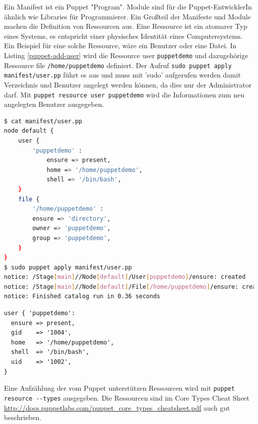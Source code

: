 \documentclass[12pt,a4paper,ngerman]{article}
\begin{document}
Ein Manifest ist ein Puppet "Program". Module sind für die Puppet-EntwicklerIn ähnlich wie Libraries für Programmierer. Ein Großteil der Manifeste und Module machen die Definition von Ressourcen aus. Eine Ressource ist ein atomarer Typ eines Systems, es entspricht einer physisches Identität eines Computersystems. Ein Beispiel für eine solche Ressource, wäre ein Benutzer oder eine Datei. In Listing \ref{puppet-add-user} wird die Ressource user \lstinline$puppetdemo$ und dazugehörige Ressource file \lstinline$/home/puppetdemo$ definiert. Der Aufruf \lstinline$sudo puppet apply manifest/user.pp$ führt es aus und muss mit 'sudo' aufgerufen werden damit Verzeichnis und Benutzer angelegt werden können, da dies nur der Administrator darf.
Mit \lstinline$puppet resource user puppetdemo$ wird die Informationen zum neu angelegten Benutzer ausgegeben.


\begin{lstlisting}[language=sh,caption=User mit Puppet anlegen, label=puppet-add-user]
$ cat manifest/user.pp 
node default {
    user {
        'puppetdemo' :
            ensure => present,
            home => '/home/puppetdemo',
            shell => '/bin/bash',
    }
    file {
        '/home/puppetdemo' :
        ensure => 'directory',
        owner => 'puppetdemo',
        group => 'puppetdemo',
    }
}
$ sudo puppet apply manifest/user.pp 
notice: /Stage[main]//Node[default]/User[puppetdemo]/ensure: created
notice: /Stage[main]//Node[default]/File[/home/puppetdemo]/ensure: created
notice: Finished catalog run in 0.36 seconds
\end{lstlisting}
\begin{lstlisting}[language=puppet,caption=Anzeige der Benutzerinformation in Puppet, label=puppet-add-user-info]
user { 'puppetdemo':
  ensure => present,
  gid    => '1004',
  home   => '/home/puppetdemo',
  shell  => '/bin/bash',
  uid    => '1002',
}
\end{lstlisting}

Eine Aufzählung der vom Puppet unterstützen Ressourcen wird mit \lstinline$puppet resource --types$ ausgegeben. Die Ressourcen sind im Core Types Cheat Sheet \url{http://docs.puppetlabs.com/puppet_core_types_cheatsheet.pdf} auch gut beschrieben.


\end{document}
